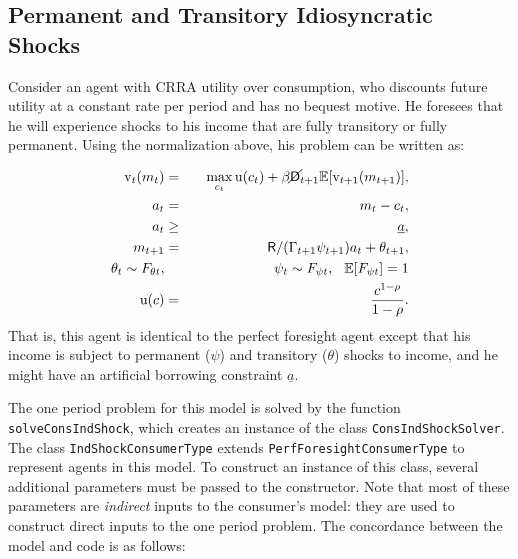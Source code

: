 \documentclass[12pt,titlepage,letterpaper]{econtex}
\newcommand{\E}{\mathbb{E}}
\begin{document}
\subsection{Permanent and Transitory Idiosyncratic Shocks}

Consider an agent with CRRA utility over consumption, who discounts future utility at a constant rate per period and has no bequest motive.  He foresees that he will experience shocks to his income that are fully transitory or fully permanent.  Using the normalization above, his problem can be written as:

\begin{eqnarray*}
\vFunc_t(m_t) &=& \max_{c_t} \utilFunc(c_t) + \beta \PLives_{t+1} \E [\vFunc_{t+1}(m_{t+1}) ], \\
a_t &=& m_t - c_t, \\
a_t &\geq& \underline{a}, \\
m_{t+1} &=& \Rfree/(\Gamma_{t+1} \psi_{t+1}) a_t + \theta_{t+1}, \\
\theta_t \sim F_{\theta t}, &\qquad& \psi_t \sim F_{\psi t}, \hspace{0.25cm} \E[F_{\psi t}] = 1\\
\utilFunc(c) &=& \frac{c^{1-\CRRA}}{1-\CRRA}.
\end{eqnarray*}
That is, this agent is identical to the perfect foresight agent except that his income is subject to permanent ($\psi$) and transitory ($\theta$) shocks to income, and he might have an artificial borrowing constraint $\underline{a}$.

The one period problem for this model is solved by the function \texttt{solveConsIndShock}, which creates an instance of the class \texttt{ConsIndShockSolver}.  The class \texttt{IndShockConsumerType} extends \texttt{PerfForesightConsumerType} to represent agents in this model.  To construct an instance of this class, several additional parameters must be passed to the constructor.  Note that most of these parameters are \textit{indirect} inputs to the consumer's model: they are used to construct direct inputs to the one period problem.  The concordance between the model and code is as follows:
\end{document}
